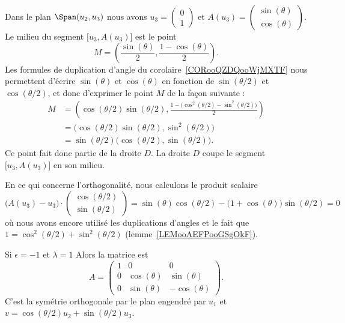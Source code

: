 \begin{subproof}
	Dans le plan \( \Span(u_2,u_3)\) nous avons \( u_3=\begin{pmatrix}
		0 \\
		1
	\end{pmatrix}\) et \( A(u_3)=\begin{pmatrix}
		\sin(\theta) \\
		\cos(\theta)
	\end{pmatrix}\). Le milieu du segment \( \mathopen[ u_3 , A(u_3) \mathclose]\) est le point
	\begin{equation}
		M=\left( \frac{ \sin(\theta) }{2},\frac{ 1-\cos(\theta) }{2} \right).
	\end{equation}
	Les formules de duplication d'angle du corolaire~\ref{CORooQZDQooWjMXTF} nous permettent d'écrire \( \sin(\theta)\) et \( \cos(\theta)\) en fonction de \( \sin(\theta/2)\) et \( \cos(\theta/2)\), et donc d'exprimer le point \( M\) de la façon suivante :
	\begin{subequations}
		\begin{align}
			M & =\left( \cos(\theta/2)\sin(\theta/2),\frac{ 1-\big( \cos^2(\theta/2)-\sin^2(\theta/2) \big) }{2} \right) \\
			  & =\big( \cos(\theta/2)\sin(\theta/2),\sin^2(\theta/2) \big)                                               \\
			  & =\sin(\theta/2)\big( \cos(\theta/2),\sin(\theta/2) \big).
		\end{align}
	\end{subequations}
	Ce point fait donc partie de la droite \( D\). La droite \( D\) coupe le segment \( \mathopen[ u_3 , A(u_3) \mathclose]\) en son milieu.

	En ce qui concerne l'orthogonalité, nous calculons le produit scalaire
	\begin{equation}
		\big( A(u_3)-u_3 \big)\cdot\begin{pmatrix}
			\cos(\theta/2) \\
			\sin(\theta/2)
		\end{pmatrix}
		=\sin(\theta)\cos(\theta/2)-\big( 1+\cos(\theta) \big)\sin(\theta/2)=0
	\end{equation}
	où nous avons encore utilisé les duplications d'angles et le fait que \( 1=\cos^2(\theta/2)+\sin^2(\theta/2)\) (lemme~\ref{LEMooAEFPooGSgOkF}).

	\item[Si \( \epsilon=-1\) et \( \lambda=1\)] Alors la matrice est
	\begin{equation}
		A=\begin{pmatrix}
			1 & 0            & 0             \\
			0 & \cos(\theta) & \sin(\theta)  \\
			0 & \sin(\theta) & -\cos(\theta)
		\end{pmatrix}.
	\end{equation}
	C'est la symétrie orthogonale par le plan engendré par \( u_1\) et \( v=\cos(\theta/2)u_2+\sin(\theta/2)u_3\).


\end{subproof}
